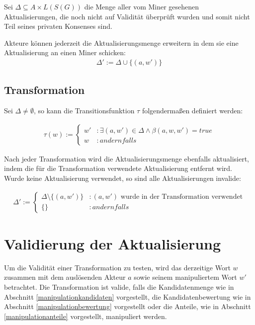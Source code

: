 \documentclass[a4paper,12pt]{report}
\begin{document}
Sei $\Delta \subseteq A\times L(S(G))$ die Menge aller vom Miner gesehenen Aktualisierungen, die noch nicht auf Validität überprüft wurden und somit nicht Teil seines privaten Konsenses sind.


Akteure können jederzeit die Aktualisierungsmenge erweitern in dem sie eine Aktualisierung an einen Miner schicken: 
\begin{eqnarray}
\Delta' := \Delta \cup \{(a,w')\}
\end{eqnarray}


\subsection{Transformation}
Sei $\Delta \neq \emptyset$, so kann die Transitionsfunktion $\tau$ folgendermaßen definiert werden:

\begin{eqnarray}
  \tau( w ) := 
  \begin{cases}
    w'  &: \exists (a,w') \in \Delta \land \beta(a,w,w') = true \\
    w   &: andernfalls 
  \end{cases}
\end{eqnarray}

Nach jeder Transformation wird die Aktualisierungsmenge ebenfalls aktualisiert, indem die für die Transformation verwendete Aktualisierung entfernt wird. Wurde keine Aktualisierung verwendet, so sind alle Aktualisierungen invalide:

\begin{eqnarray}
  \Delta' := 
  \begin{cases}
    \Delta\setminus \{ (a, w' )\} &: (a,w')\text{ wurde in der Transformation verwendet} \\
    \{\} &: andernfalls
  \end{cases}
\end{eqnarray}


\section{Validierung der Aktualisierung}
\label{transvalid}

Um die Validität einer Transformation zu testen, wird das derzeitige Wort $w$ zusammen mit dem auslösenden Akteur $a$ sowie seinem manipuliertem Wort $w'$ betrachtet. Die Transformation ist valide, falls die Kandidatenmenge wie in Abschnitt \ref{manipulationkandidaten} vorgestellt, die Kandidatenbewertung wie in Abschnitt \ref{manipulationbewertung} vorgestellt oder die Anteile, wie in Abschnitt \ref{manipulationanteile} vorgestellt, manipuliert werden.
\end{document}

